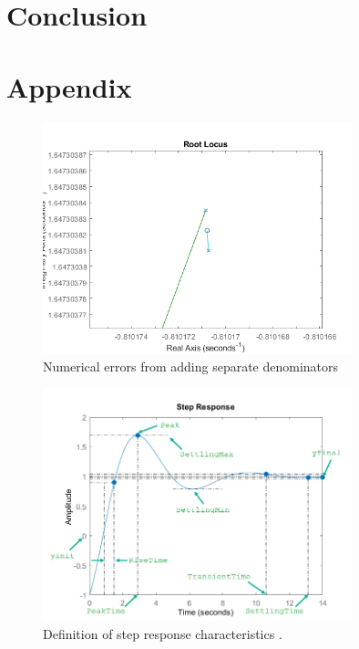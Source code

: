 \documentclass{article}
\begin{document}
\section{Conclusion}


\section{Appendix}

\begin{figure}
    \centering
    \includegraphics[width=0.8\textwidth]{figures/numerical_errors.png}
    \caption{Numerical errors from adding separate denominators}
    \label{fig:matlab_numerical_errors}
\end{figure}

\begin{figure}[H]
    \centering
    \includegraphics[width=0.8\textwidth]{figures/step-characteristics.png}
    \caption{Definition of step response characteristics \cite{matlab}.}
    \label{fig:matlab_step_chics}
\end{figure}
\end{document}
